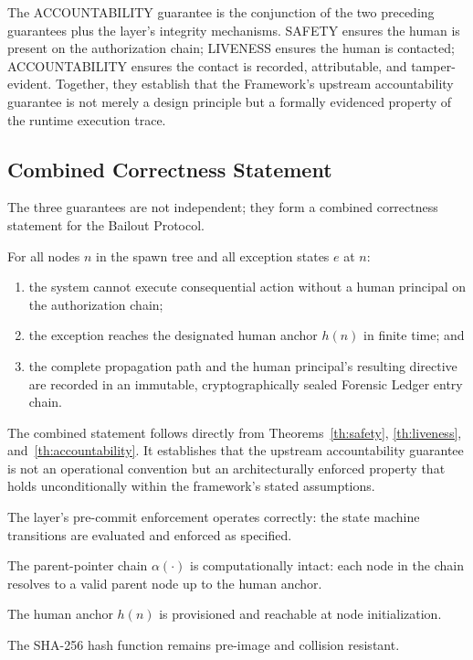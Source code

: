 The ACCOUNTABILITY guarantee is the conjunction of the two preceding guarantees
plus the \fact{} layer's integrity mechanisms.  SAFETY ensures the human is
present on the authorization chain; LIVENESS ensures the human is contacted;
ACCOUNTABILITY ensures the contact is recorded, attributable, and tamper-evident.
Together, they establish that the \bxthree{} Framework's upstream accountability
guarantee is not merely a design principle but a formally evidenced property of
the runtime execution trace.

\subsection{Combined Correctness Statement}
\label{sec:combined-correctness}

The three guarantees are not independent; they form a combined correctness
statement for the Bailout Protocol.

\begin{maintheorem}
\label{th:combined-correctness}
For all nodes $n$ in the spawn tree and all exception states $e$ at $n$:

\begin{enumerate}
\item[SAFETY:] the system cannot execute consequential action without a human
principal on the authorization chain;
\item[LIVENESS:] the exception reaches the designated human anchor $h(n)$ in
finite time; and
\item[ACCOUNTABILITY:] the complete propagation path and the human principal's
resulting directive are recorded in an immutable, cryptographically sealed
Forensic Ledger entry chain.
\end{enumerate}
\end{maintheorem}

The combined statement follows directly from Theorems~\ref{th:safety},
\ref{th:liveness}, and~\ref{th:accountability}.  It establishes that the
upstream accountability guarantee is not an operational convention but an
architecturally enforced property that holds unconditionally within the
framework's stated assumptions.

\begin{conditions-list}
\item The \fact{} layer's pre-commit enforcement operates correctly: the
state machine transitions are evaluated and enforced as specified.
\item The parent-pointer chain $\alpha(\cdot)$ is computationally intact:
each node in the chain resolves to a valid parent node up to the human anchor.
\item The human anchor $h(n)$ is provisioned and reachable at node
initialization.
\item The SHA-256 hash function remains pre-image and collision resistant.
\end{conditions-list}

